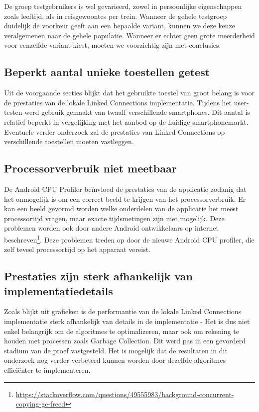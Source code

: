 De groep testgebruikers is wel gevarieerd, zowel in persoonlijke eigenschappen zoals leeftijd, als in reisgewoontes per trein. Wanneer de gehele testgroep duidelijk de voorkeur geeft aan een bepaalde variant, kunnen we deze keuze veralgemenen naar de gehele populatie. Wanneer er echter geen grote meerderheid voor eenzelfde variant kiest, moeten we voorzichtig zijn met conclusies.

\subsection{Beperkt aantal unieke toestellen getest}
Uit de voorgaande secties blijkt dat het gebruikte toestel van groot belang is voor de prestaties van de lokale Linked Connections implementatie. Tijdens het user-testen werd gebruik gemaakt van twaalf verschillende smartphones. Dit aantal is relatief beperkt in vergelijking met het aanbod op de huidige smartphonemarkt. Eventuele verder onderzoek zal de prestaties van Linked Connections op verschillende toestellen moeten vastleggen.

\subsection{Processorverbruik niet meetbaar}
De Android CPU Profiler beïnvloed de prestaties van de applicatie zodanig dat het onmogelijk is om een correct beeld te krijgen van het processorverbruik. Er kan een beeld gevormd worden welke onderdelen van de applicatie het meest processortijd vragen, maar exacte tijdsmetingen zijn niet mogelijk. Deze problemen worden ook door andere Android ontwikkelaars op internet beschreven\footnote{\url{https://stackoverflow.com/questions/49555983/background-concurrent-copying-gc-freed}}. Deze problemen treden op door de nieuwe Android CPU profiler, die zelf teveel processortijd op het apparaat vereist.

\subsection{Prestaties zijn sterk afhankelijk van implementatiedetails}
Zoals blijkt uit grafieken %
is de performantie van de lokale Linked Connections implementatie sterk afhankelijk van details in de implementatie - Het is dus niet enkel belangrijk om de algoritmes te optimalizeren, maar ook om rekening te houden met processen zoals Garbage Collection. Dit werd pas in een gevorderd stadium van de proef vastgesteld. Het is mogelijk dat de resultaten in dit onderzoek nog verder verbeterd kunnen worden door dezelfde algoritmes efficiënter te implementeren.